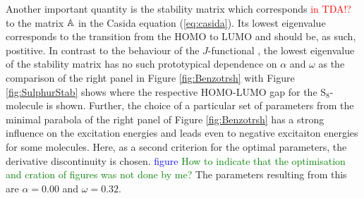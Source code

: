 Another important quantity is the stability matrix which corresponds \textcolor{red}{in TDA!?} to the matrix $\mathbb{A}$ in the Casida equation (\ref{eq:casida}).
Its lowest eigenvalue corresponds to the transition from the HOMO to LUMO and should be, as such, postitive.
In contrast to the behaviour of the $J$-functional , the lowest eigenvalue of the stability matrix has no such prototypical dependence on $\alpha$ and $\omega$ as the comparison of the right panel in Figure \ref{fig:Benzotrsh} with Figure \ref{fig:SulphurStab} shows where the respective HOMO-LUMO gap for the S$_8$-molecule is shown.
Further, the choice of a particular set of parameters from the minimal parabola of the right panel of Figure \ref{fig:Benzotrsh} has a strong influence on the excitation energies and leads even to negative excitaiton energies for some molecules.
Here, as a second criterion for the optimal parameters, the derivative discontinuity is chosen.
\textcolor{blue}{figure}
\textcolor{green}{How to indicate that the optimisation and cration of figures was not done by me?}
The parameters resulting from this are $\alpha=0.00$ and $\omega=0.32$.

